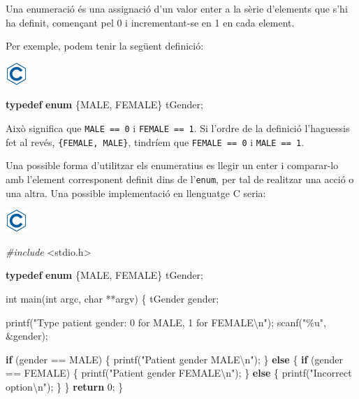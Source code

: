 \documentclass[]{book}
\newenvironment{Shaded}{\begin{snugshade}}{\end{snugshade}}
\newcommand{\ControlFlowTok}[1]{\textcolor[rgb]{0.13,0.29,0.53}{\textbf{#1}}}
\newcommand{\DataTypeTok}[1]{\textcolor[rgb]{0.13,0.29,0.53}{#1}}
\newcommand{\DecValTok}[1]{\textcolor[rgb]{0.00,0.00,0.81}{#1}}
\newcommand{\ImportTok}[1]{#1}
\newcommand{\KeywordTok}[1]{\textcolor[rgb]{0.13,0.29,0.53}{\textbf{#1}}}
\newcommand{\NormalTok}[1]{#1}
\newcommand{\PreprocessorTok}[1]{\textcolor[rgb]{0.56,0.35,0.01}{\textit{#1}}}
\newcommand{\SpecialCharTok}[1]{\textcolor[rgb]{0.00,0.00,0.00}{#1}}
\newcommand{\StringTok}[1]{\textcolor[rgb]{0.31,0.60,0.02}{#1}}
\begin{document}
Una enumeració és una assignació d'un valor enter a la sèrie d'elements que s'hi ha definit, començant pel 0 i incrementant-se en 1 en cada element.

Per exemple, podem tenir la següent definició:

\includegraphics{./img/c.png}

\begin{Shaded}
\begin{Highlighting}[]
\KeywordTok{typedef} \KeywordTok{enum}\NormalTok{ \{MALE, FEMALE\} tGender;}
\end{Highlighting}
\end{Shaded}

Això significa que \texttt{MALE\ ==\ 0} i \texttt{FEMALE\ ==\ 1}. Si l'ordre de la definició l'haguessis fet al revés, \texttt{\{FEMALE,\ MALE\}}, tindríem que \texttt{FEMALE\ ==\ 0} i \texttt{MALE\ ==\ 1}.

Una possible forma d'utilitzar els enumeratius es llegir un enter i comparar-lo amb l'element corresponent definit dins de l'\texttt{enum}, per tal de realitzar una acció o una altra. Una possible implementació en llenguatge C seria:

\includegraphics{./img/c.png}

\begin{Shaded}
\begin{Highlighting}[]
\PreprocessorTok{\#include }\ImportTok{\textless{}stdio.h\textgreater{}}

\KeywordTok{typedef} \KeywordTok{enum}\NormalTok{ \{MALE, FEMALE\} tGender;}

\DataTypeTok{int}\NormalTok{ main(}\DataTypeTok{int}\NormalTok{ argc, }\DataTypeTok{char}\NormalTok{ **argv) \{}
\NormalTok{   tGender gender;}

\NormalTok{   printf(}\StringTok{"Type patient gender: 0 for MALE, 1 for FEMALE}\SpecialCharTok{\textbackslash{}n}\StringTok{"}\NormalTok{);}
\NormalTok{   scanf(}\StringTok{"\%u"}\NormalTok{, \&gender);}

   \ControlFlowTok{if}\NormalTok{ (gender == MALE) \{}
\NormalTok{      printf(}\StringTok{"Patient gender MALE}\SpecialCharTok{\textbackslash{}n}\StringTok{"}\NormalTok{);}
\NormalTok{   \} }\ControlFlowTok{else}\NormalTok{ \{}
      \ControlFlowTok{if}\NormalTok{ (gender == FEMALE) \{}
\NormalTok{         printf(}\StringTok{"Patient gender FEMALE}\SpecialCharTok{\textbackslash{}n}\StringTok{"}\NormalTok{);}
\NormalTok{      \} }\ControlFlowTok{else}\NormalTok{ \{}
\NormalTok{         printf(}\StringTok{"Incorrect option}\SpecialCharTok{\textbackslash{}n}\StringTok{"}\NormalTok{);}
\NormalTok{      \}}
\NormalTok{   \}}
   \ControlFlowTok{return} \DecValTok{0}\NormalTok{;}
\NormalTok{\}}
\end{Highlighting}
\end{Shaded}
\end{document}

